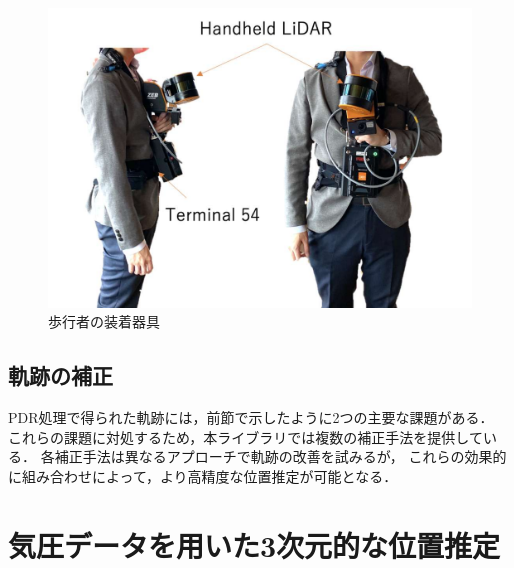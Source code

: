 \begin{figure}[ht]
	\centering
	\includegraphics[width=\linewidth]{../image/lidar.pdf}
	\caption{歩行者の装着器具}    \label{fig:device}
\end{figure}






\subsection{軌跡の補正}

PDR処理で得られた軌跡には，前節で示したように2つの主要な課題がある．
これらの課題に対処するため，本ライブラリでは複数の補正手法を提供している．
各補正手法は異なるアプローチで軌跡の改善を試みるが，
これらの効果的に組み合わせによって，より高精度な位置推定が可能となる．








\section{気圧データを用いた3次元的な位置推定}



